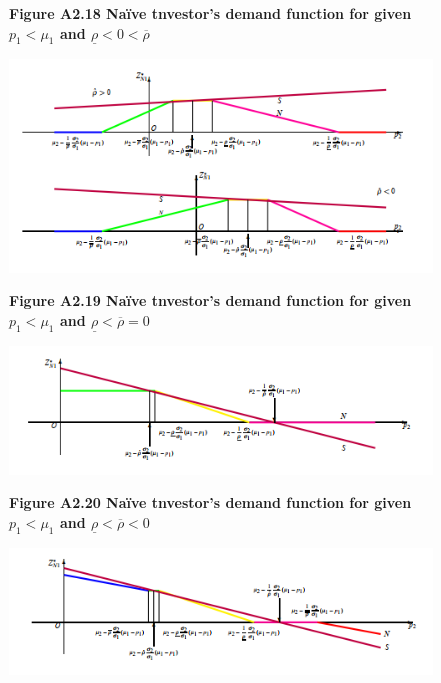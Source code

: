 \documentclass[10.0pt]{article}
\begin{document}
\begin{figure}
\centerline{\bf Figure A2.18 \quad Na\"ive tnvestor's demand function for given $ p_1 < \mu_1 $ and $ \underline{\rho} < 0 < \overline{\rho} $}
	\centering
	\includegraphics[width=1.0 \textwidth]{FigureA2.18.png}
\end{figure}





\begin{figure}
\centerline{\bf Figure A2.19 \quad Na\"ive tnvestor's demand function for given $ p_1 < \mu_1 $ and $ \underline{\rho} < \overline{\rho} = 0 $}
	\centering
	\includegraphics[width=1.0 \textwidth]{FigureA2.19.png}
\end{figure}



\begin{figure}
\centerline{\bf Figure A2.20 \quad Na\"ive tnvestor's demand function for given $ p_1 < \mu_1 $ and $ \underline{\rho} < \overline{\rho} < 0 $}
	\centering
	\includegraphics[width=1.0 \textwidth]{FigureA2.20.png}
\end{figure}
\end{document}
